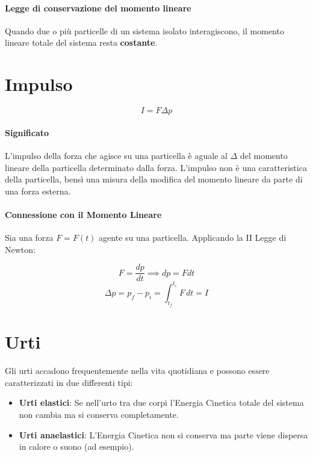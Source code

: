         \paragraph{Legge di conservazione del momento lineare} Quando due o più
        particelle di un sistema isolato interagiscono, il momento lineare 
        totale del sistema resta \textbf{costante}.


    \section{Impulso}

        \begin{equation}
            I = F \Delta p
        \end{equation}

        \paragraph{Significato} L'impulso della forza che agisce su una 
        particella è aguale al $\Delta$ del momento lineare della particella 
        determinato dalla forza. L'impulso non è una caratteristica della 
        particella, bensì una misura della modifica del momento lineare da parte
         di una forza esterna.

        \paragraph{Connessione con il Momento Lineare} Sia una forza $F = F(t)$
        agente su una particella. Applicando la II Legge di Newton:

        \begin{equation*}
            F = \frac{dp}{dt} \implies dp = F dt
        \end{equation*}
        \begin{equation*}
            \Delta p = p_f - p_i = \int_{t_f}^{t_i} F \,dt = I 
        \end{equation*}
    
    \section{Urti} Gli urti accadono frequentemente nella vita quotidiana e 
    possono essere caratterizzati in due differenti tipi:
    \begin{itemize}
        \item \textbf{Urti elastici}: Se nell'urto tra due corpi l'Energia 
        Cinetica totale del sistema non cambia ma si conserva completamente.
        \item \textbf{Urti anaelastici}: L'Energia Cinetica non si conserva ma 
        parte viene dispersa in calore o suono (ad esempio).
    \end{itemize} 

